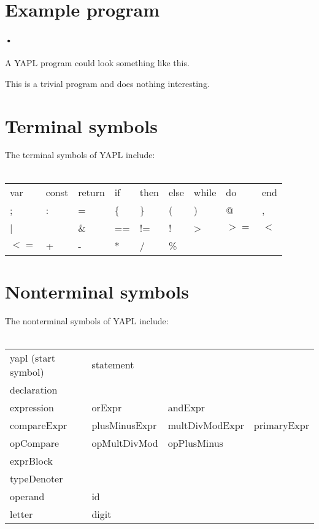 \setlength{\grammarparsep}{10pt plus 1pt minus 1pt} %
\setlength{\grammarindent}{12em} %
\section{Example program}

\paragraph{•}
A YAPL program could look something like this.


This is a trivial program and does nothing interesting. 
\section{Terminal symbols}
The terminal symbols of YAPL include:\\\\
\begin{tabular}{lllllllll}
var		&	const	&	return	&	if	&	then	&	else	&	while	&	do		&	end 	\\
;		&	: 		& 	= 		& 	\{ 	& 	\} 		& 	( 		& 	) 		& 	@ 		& 	, 		\\ 
| 		& 	\		&	\& 		& 	== 	& 	!= 		& 	! 		& 	> 		& 	$>=$	& 	$<$ 	\\
$<=$	&	+ 		& 	- 		& 	* 	& 	/ 		& 	\% 	\\
\end{tabular}

\section{Nonterminal symbols}
The nonterminal symbols of YAPL include:\\\\
\begin{tabular}{llll}
yapl	 (start symbol)		&	statement		&					&				\\
declaration					&					&					&				\\
expression					&	orExpr			&	andExpr			&				\\
compareExpr					&	plusMinusExpr	&	multDivModExpr	&	primaryExpr	\\
opCompare					&	opMultDivMod	&	opPlusMinus		&				\\
exprBlock					&					&					&				\\
typeDenoter					&					&					&				\\
operand						&	id				&					&				\\
letter						&	digit			&					&				\\
\end{tabular}

